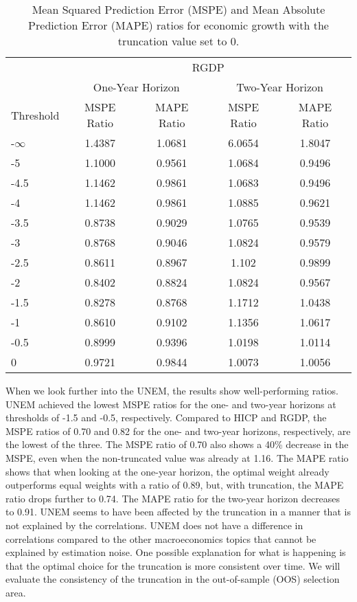 \documentclass[11pt]{article}
\begin{document}
	\begin{table}[!h]
		\centering
		\caption{Mean Squared Prediction Error (MSPE) and Mean Absolute Prediction Error (MAPE) ratios for economic growth with the truncation value set to 0.}
		\label{tab: MSPE RGDP}
		\begin{tabular}{lcccc}
			\hline\hline
			& \multicolumn{4}{c}{RGDP}                                                \\
			\cmidrule(lr){2-5}
			& \multicolumn{2}{c}{One-Year Horizon} & \multicolumn{2}{c}{Two-Year Horizon} \\
			\cmidrule(lr){2-3} \cmidrule(lr){4-5}
			Threshold & MSPE Ratio &    MAPE Ratio    & MSPE Ratio &    MAPE Ratio    \\ 
			\hline
			-$\infty$ & 1.4387 & 1.0681 & 6.0654 & 1.8047\\ 
			-5 & 1.1000 & 0.9561 & 1.0684 & 0.9496\\ 
			-4.5 & 1.1462 & 0.9861 & 1.0683 & 0.9496\\ 
			-4 & 1.1462 & 0.9861 & 1.0885 & 0.9621\\ 
			-3.5 & 0.8738 & 0.9029 & 1.0765 & 0.9539\\ 
			-3 & 0.8768 & 0.9046 & 1.0824 & 0.9579\\ 
			-2.5 & 0.8611 & 0.8967 & 1.102 & 0.9899\\ 
			-2 & 0.8402 & 0.8824 & 1.0824 & 0.9567\\ 
			-1.5 & 0.8278 & 0.8768 & 1.1712 & 1.0438\\ 
			-1 & 0.8610 & 0.9102 & 1.1356 & 1.0617\\ 
			-0.5 & 0.8999 & 0.9396 & 1.0198 & 1.0114\\ 
			0 & 0.9721 & 0.9844 & 1.0073 & 1.0056\\  \hline\hline
		\end{tabular}
	\end{table}
	
	
	When we look further into the UNEM, the results show well-performing ratios. UNEM achieved the lowest MSPE ratios for the one- and two-year horizons at thresholds of -1.5 and -0.5, respectively. Compared to HICP and RGDP, the MSPE ratios of 0.70 and 0.82 for the one- and two-year horizons, respectively, are the lowest of the three. The MSPE ratio of 0.70 also shows a 40\% decrease in the MSPE, even when the non-truncated value was already at 1.16. The MAPE ratio shows that when looking at the one-year horizon, the optimal weight already outperforms equal weights with a ratio of 0.89, but, with truncation, the MAPE ratio drops further to 0.74. The MAPE ratio for the two-year horizon decreases to 0.91. UNEM seems to have been affected by the truncation in a manner that is not explained by the correlations. UNEM does not have a difference in correlations compared to the other macroeconomics topics that cannot be explained by estimation noise. One possible explanation for what is happening is that the optimal choice for the truncation is more consistent over time. We will evaluate the consistency of the truncation in the out-of-sample (OOS) selection area.
	
\end{document}
